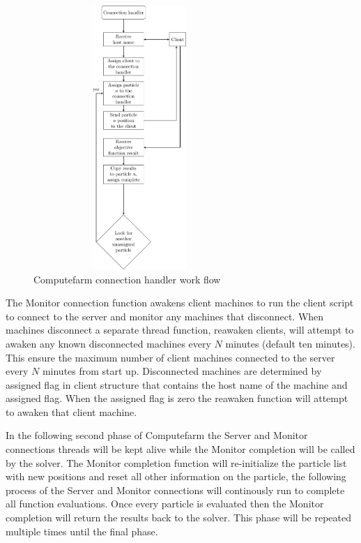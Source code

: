 \begin{figure}[h!]
    \centering
    \includegraphics[width=8cm,height=10cm]{chapters/chapter_3_Software/connection_handler.pdf}
    \caption{Computefarm connection handler work flow}
    \label{fig:connection handler}
\end{figure}

The Monitor connection function awakens client machines to run the client script to connect to the server and monitor any machines that disconnect. When machines disconnect a separate thread function, reawaken clients, will attempt to awaken any known disconnected machines every $N$ minutes (default ten minutes). This ensure the maximum number of client machines connected to the server every $N$ minutes from start up. Disconnected machines are determined by assigned flag in client
structure that contains the host name of the machine  and assigned flag. When the assigned flag is zero the reawaken function will attempt to awaken that client machine. 

In the following second phase of Computefarm the Server and Monitor connections threads will be kept alive while the Monitor completion will be called by the solver. The Monitor completion function will re-initialize the particle list with new positions and reset all other information on the particle, the following process of the Server and Monitor connections will continously run to complete all function evaluations. Once every particle is evaluated then the Monitor completion will return
the results back to the solver. This phase will be repeated multiple times until the final phase. 

